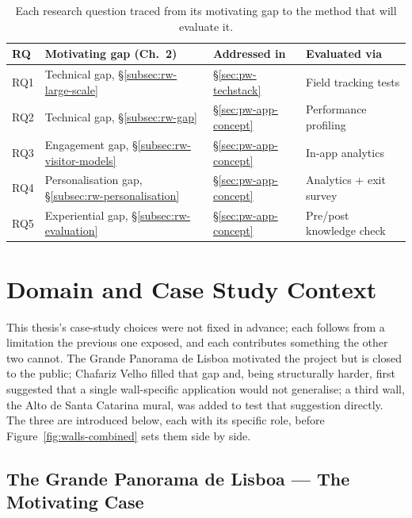 \begin{table}[h]
\centering
\caption{Each research question traced from its motivating gap to the
method that will evaluate it.}
\label{tab:rq-method-map}
\small
\begin{tabular}{p{1.1cm}p{4.5cm}p{2.6cm}p{4.4cm}}
\toprule
\textbf{RQ} & \textbf{Motivating gap (Ch.~2)} & \textbf{Addressed in} & \textbf{Evaluated via} \\
\midrule
RQ1 & Technical gap, \S\ref{subsec:rw-large-scale} & \S\ref{sec:pw-techstack} & Field tracking tests \\
RQ2 & Technical gap, \S\ref{subsec:rw-gap} & \S\ref{sec:pw-app-concept} & Performance profiling \\
RQ3 & Engagement gap, \S\ref{subsec:rw-visitor-models} & \S\ref{sec:pw-app-concept} & In-app analytics \\
RQ4 & Personalisation gap, \S\ref{subsec:rw-personalisation} & \S\ref{sec:pw-app-concept} & Analytics + exit survey \\
RQ5 & Experiential gap, \S\ref{subsec:rw-evaluation} & \S\ref{sec:pw-app-concept} & Pre/post knowledge check \\
\bottomrule
\end{tabular}
\end{table}
 
 
\section{Domain and Case Study Context}
\label{sec:pw-domain}

This thesis's case-study choices were not fixed in advance; each follows
from a limitation the previous one exposed, and each contributes
something the other two cannot. The Grande Panorama de Lisboa motivated
the project but is closed to the public; Chafariz Velho filled that gap
and, being structurally harder, first suggested that a single
wall-specific application would not generalise; a third wall, the Alto
de Santa Catarina mural, was added to test that suggestion directly. The
three are introduced below, each with its specific role, before
Figure~\ref{fig:walls-combined} sets them side by side.

\subsection{The Grande Panorama de Lisboa --- The Motivating Case}
\label{subsec:pw-panorama}
 
